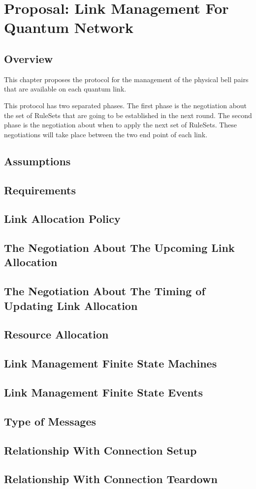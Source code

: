 \chapter{Proposal: Link Management For Quantum Network}
\label{proposal}

\section{Overview}

This chapter proposes the protocol for the management of the physical bell pairs that are available on each quantum link.

This protocol has two separated phases. The first phase is the negotiation about the set of RuleSets that are going to be established in the next round. The second phase is the negotiation about when to apply the next set of RuleSets.
These negotiations will take place between the two end point of each link.

\section{Assumptions}

\section{Requirements}
\section{Link Allocation Policy}
\section{The Negotiation About The Upcoming Link Allocation}
\section{The Negotiation About The Timing of Updating Link Allocation}
\section{Resource Allocation }
\section{Link Management Finite State Machines}
\section{Link Management Finite State Events}
\section{Type of Messages}
\section{Relationship With Connection Setup}
\section{Relationship With Connection Teardown}

